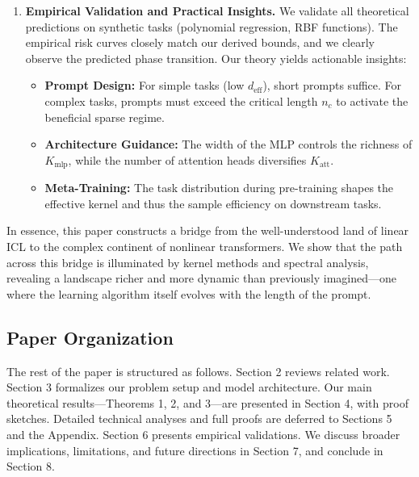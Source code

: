 \begin{enumerate}
	\item \textbf{Empirical Validation and Practical Insights.} We validate all theoretical predictions on synthetic tasks (polynomial regression, RBF functions). The empirical risk curves closely match our derived bounds, and we clearly observe the predicted phase transition. Our theory yields actionable insights:
	\begin{itemize}
		\item \textbf{Prompt Design:} For simple tasks (low $d_{\text{eff}}$), short prompts suffice. For complex tasks, prompts must exceed the critical length $n_c$ to activate the beneficial sparse regime.
		\item \textbf{Architecture Guidance:} The width of the MLP controls the richness of $K_{\text{mlp}}$, while the number of attention heads diversifies $K_{\text{att}}$.
		\item \textbf{Meta-Training:} The task distribution during pre-training shapes the effective kernel and thus the sample efficiency on downstream tasks.
	\end{itemize}
\end{enumerate}

In essence, this paper constructs a bridge from the well-understood land of linear ICL to the complex continent of nonlinear transformers. We show that the path across this bridge is illuminated by kernel methods and spectral analysis, revealing a landscape richer and more dynamic than previously imagined—one where the learning algorithm itself evolves with the length of the prompt.

\subsection{Paper Organization}
The rest of the paper is structured as follows. Section 2 reviews related work. Section 3 formalizes our problem setup and model architecture. Our main theoretical results—Theorems 1, 2, and 3—are presented in Section 4, with proof sketches. Detailed technical analyses and full proofs are deferred to Sections 5 and the Appendix. Section 6 presents empirical validations. We discuss broader implications, limitations, and future directions in Section 7, and conclude in Section 8.